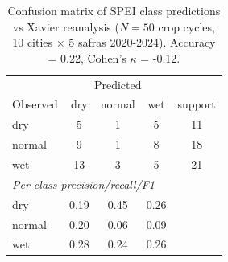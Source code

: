 \begin{table}[t]
\centering
\caption{Confusion matrix of SPEI class predictions vs Xavier reanalysis (\(N=50\) crop cycles, 10 cities $\times$ 5 safras 2020-2024). Accuracy = 0.22, Cohen's $\kappa$ = -0.12.}
\label{tab:confusion-matrix}
\begin{tabular}{lccc|c}
\toprule
 & \multicolumn{3}{c}{Predicted} & \\
Observed & dry & normal & wet & support \\
\midrule
dry & 5 & 1 & 5 & 11 \\
normal & 9 & 1 & 8 & 18 \\
wet & 13 & 3 & 5 & 21 \\
\midrule
\multicolumn{5}{l}{\textit{Per-class precision/recall/F1}}\\
dry & 0.19 & 0.45 & 0.26 & \\
normal & 0.20 & 0.06 & 0.09 & \\
wet & 0.28 & 0.24 & 0.26 & \\
\bottomrule
\end{tabular}
\end{table}